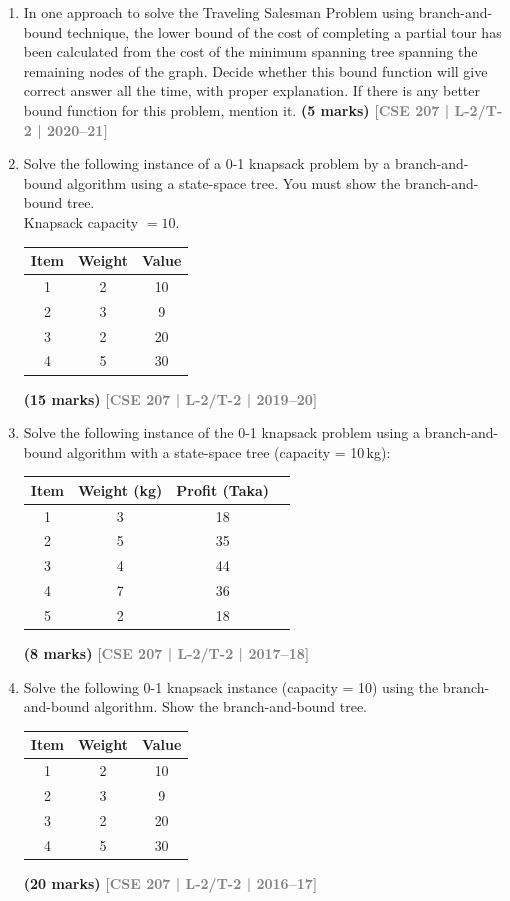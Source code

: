 \documentclass[12pt,a3paper]{article}
\newcommand{\yr}[1]{\hfill\textcolor{gray}{\small\textbf{[#1]}}}
\newcommand{\mk}[1]{\textcolor{orange!70!black}{\small\textbf{(#1 marks)}}}
\begin{document}
\begin{enumerate}
Find the optimal tour using branch and bound, and pruning techniques combined.
\mk{20} \yr{CSE 207 | L-2/T-2 | 2021--22}

\item In one approach to solve the Traveling Salesman Problem using branch-and-bound technique, the lower bound of the cost of completing a partial tour has been calculated from the cost of the minimum spanning tree spanning the remaining nodes of the graph. Decide whether this bound function will give correct answer all the time, with proper explanation. If there is any better bound function for this problem, mention it.
\mk{5} \yr{CSE 207 | L-2/T-2 | 2020--21}

\item Solve the following instance of a 0-1 knapsack problem by a branch-and-bound algorithm using a state-space tree. You must show the branch-and-bound tree.\\[4pt]
Knapsack capacity $= 10$.
\begin{center}
\begin{tabular}{|c|c|c|}
\hline
\textbf{Item} & \textbf{Weight} & \textbf{Value} \\
\hline
1 & 2 & 10 \\
2 & 3 & 9  \\
3 & 2 & 20 \\
4 & 5 & 30 \\
\hline
\end{tabular}
\end{center}
\mk{15} \yr{CSE 207 | L-2/T-2 | 2019--20}


 \item Solve the following instance of the 0-1 knapsack problem using a branch-and-bound algorithm with a state-space tree (capacity = 10\,kg):
\begin{center}
\begin{tabular}{cccc}
\toprule
Item & Weight (kg) & Profit (Taka) \\
\midrule
1 & 3 & 18 \\
2 & 5 & 35 \\
3 & 4 & 44 \\
4 & 7 & 36 \\
5 & 2 & 18 \\
\bottomrule
\end{tabular}
\end{center}
\mk{8}
\yr{CSE 207 | L-2/T-2 | 2017--18}

\item Solve the following 0-1 knapsack instance (capacity = 10) using the branch-and-bound algorithm. Show the branch-and-bound tree.
\begin{center}
\begin{tabular}{ccc}
\toprule
Item & Weight & Value \\
\midrule
1 & 2 & 10 \\
2 & 3 & 9 \\
3 & 2 & 20 \\
4 & 5 & 30 \\
\bottomrule
\end{tabular}
\end{center}
\mk{20}
\yr{CSE 207 | L-2/T-2 | 2016--17}



\end{enumerate}
\end{document}
